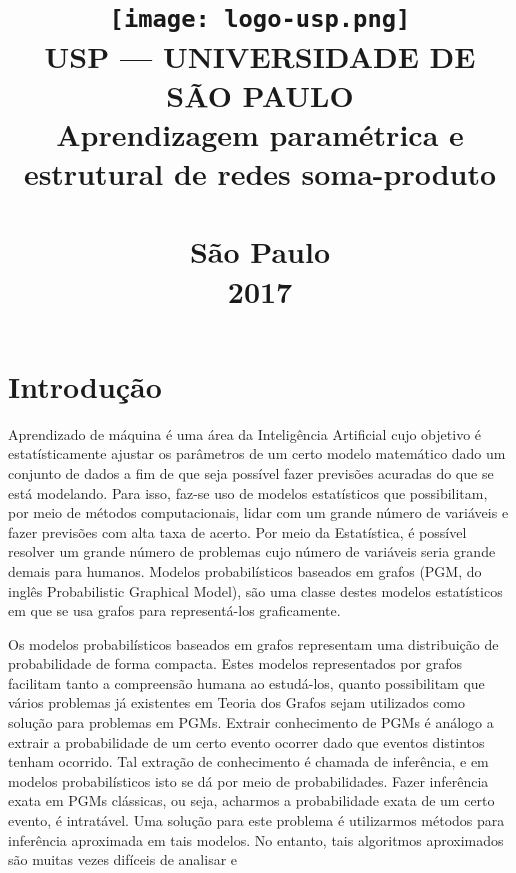 \documentclass[12pt]{article}
\title{%
  \vspace{-2.5cm}
  {\texttt{[image: logo-usp.png]}}\\
  {\textbf{\uppercase{\Large USP --- Universidade de São Paulo}}}\\
  \vspace{2cm}
  {Aprendizagem paramétrica e estrutural de redes soma-produto}\\
  \vspace{2.5cm}
\flushleft{Candidato: Renato Lui Geh\\
Orientador: Prof.\ Dr.\ Denis Deratani Mauá}\\
  \vspace{2.5cm}
  \centering
  {\textbf{São Paulo}}\\
  \vspace{0.25cm}
  {\textbf{2017}}\\
  \clearpage
}
\date{}
\theoremstyle{plain}
\numberwithin{equation}{section}
\begin{document}
\maketitle

\section{Introdução}

Aprendizado de máquina é uma área da Inteligência Artificial cujo objetivo é estatísticamente
ajustar os parâmetros de um certo modelo matemático dado um conjunto de dados a fim de que seja
possível fazer previsões acuradas do que se está modelando. Para isso, faz-se uso de modelos
estatísticos que possibilitam, por meio de métodos computacionais, lidar com um grande número de
variáveis e fazer previsões com alta taxa de acerto. Por meio da Estatística, é possível resolver
um grande número de problemas cujo número de variáveis seria grande demais para humanos.  Modelos
probabilísticos baseados em grafos (PGM, do inglês Probabilistic Graphical Model), são uma classe
destes modelos estatísticos em que se usa grafos para representá-los graficamente.

Os modelos probabilísticos baseados em grafos representam uma distribuição de probabilidade de
forma compacta. Estes modelos representados por grafos facilitam tanto a compreensão humana ao
estudá-los, quanto possibilitam que vários problemas já existentes em Teoria dos Grafos sejam
utilizados como solução para problemas em PGMs. Extrair conhecimento de PGMs é análogo a extrair a
probabilidade de um certo evento ocorrer dado que eventos distintos tenham ocorrido. Tal extração
de conhecimento é chamada de inferência, e em modelos probabilísticos isto se dá por meio de
probabilidades. Fazer inferência exata em PGMs clássicas, ou seja, acharmos a probabilidade exata
de um certo evento, é intratável. Uma solução para este problema é utilizarmos métodos para
inferência aproximada em tais modelos. No entanto, tais algoritmos aproximados são muitas vezes
difíceis de analisar e 


\printbibliography[]
\end{document}
